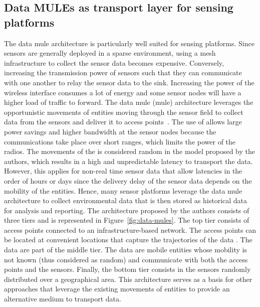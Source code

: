 \subsection{Data MULEs as transport layer for sensing platforms}
\label{sec:data-mules}

The data \acrshort{mule} architecture is particularly well suited for sensing platforms. Since sensors are generally deployed in a sparse environment, using a mesh infrastructure to collect the sensor data becomes expensive. Conversely, increasing the transmission power of sensors such that they can communicate with one another to relay the sensor data to the sink. Increasing the power of the wireless interface consumes a lot of energy and some sensor nodes will have a higher load of traffic to forward. The data \acrshort{mule} (\acrlong{mule}) architecture leverages the opportunistic movements of entities moving through the sensor field to collect data from the sensors and deliver it to access points~\cite{shah2003data}. The use of  allows large power savings and higher bandwidth at the sensor nodes because the communications take place over short ranges, which limits the power of the radios. The movements of the  is considered random in the model proposed by the authors, which results in a high and unpredictable latency to transport the data. However, this applies for non-real time sensor data that allow latencies in the order of hours or days since the delivery delay of the sensor data depends on the mobility of the entities. Hence, many sensor platforms leverage the data \acrshort{mule} architecture to collect environmental data that is then stored as historical data for analysis and reporting.
The architecture proposed by the authors consists of three tiers and is represented in Figure~\ref{fig:data-mules}. The top tier consists of access points connected to an infrastructure-based network. The access points can be located at convenient locations that capture the trajectories of the data . The data  are part of the middle tier. The data  are mobile entities whose mobility is not known (thus considered as random) and communicate with both the access points and the sensors. Finally, the bottom tier consists in the sensors randomly distributed over a geographical area. This architecture serves as a basis for other approaches that leverage the existing movements of entities to provide an alternative medium to transport data. 

